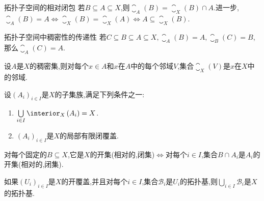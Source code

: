 \begin{proposition}{拓扑子空间的相对闭包}{}	
	若$B\subseteq A\subseteq X$,则$\closure_{A}\left(B\right)=\closure_{X}\left(B\right)\cap A$.进一步,$\closure_{A}\left(B\right)=A\iff\closure_{X}\left(B\right)=\closure_{X}\left(A\right)\iff A\subseteq\closure_{X}\left(B\right)$.
\end{proposition}

\begin{corollary}{拓扑子空间中稠密性的传递性}{}
	若$C\subseteq B\subseteq A\subseteq X,\closure_{A}\left(B\right)=A,\closure_{B}\left(C\right)=B$,那么$\closure_{A}\left(C\right)=A$.
\end{corollary}

\begin{proposition}{}{}
	设$A$是$X$的稠密集,则对每个$x\in A$和$x$在$A$中的每个邻域$V$,集合$\closure_{X}\left(V\right)$是$x$在$X$中的邻域.
\end{proposition}

\begin{proposition}{}{}
	设$\left(A_{i}\right)_{i\in I}$是$X$的子集族,满足下列条件之一:
	\begin{enumerate}
		\item $\bigcup\limits_{i\in I}\interior_{X}\left(A_{i}\right)=X$.
		\item $\left(A_{i}\right)_{i\in I}$是$X$的局部有限闭覆盖.
	\end{enumerate}
	对每个固定的$B\subseteq X$,它是$X$的开集(相对的,闭集)$\iff$对每个$i\in I$,集合$B\cap A_{i}$是$A_{i}$的开集(相对的,闭集).
\end{proposition}

\begin{remark}{}{}
	如果$\left(U_{i}\right)_{i\in I}$是$X$的开覆盖,并且对每个$i\in I$,集合$\mathcal{B}_{i}$是$U_{i}$的拓扑基,则$\bigcup\limits_{i\in I}\mathcal{B}_{i}$是$X$的拓扑基.
\end{remark}

